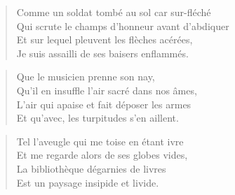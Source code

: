 \begin{verse}%
  \quatrain%
  Comme un soldat tombé au sol car sur-fléché\\  %
  Qui scrute le champs d’honneur avant d’abdiquer\\  %
  Et sur lequel pleuvent les flèches acérées,\\  %
  Je suis assailli de ses  baisers enflammés.
\end{verse}

%
\renewcommand\currentpoemtitle{Le nay}%
\begin{verse}%
  \quatrain%
  Que le musicien prenne son nay,\\  %
  Qu’il en insuffle l’air sacré dans nos âmes,\\  %
  L’air qui apaise et fait déposer les armes\\  %
  Et qu’avec, les turpitudes s’en aillent.
\end{verse}

\begin{verse}%
  \quatrain%
  Tel l’aveugle qui me toise en étant ivre\\  %
  Et me regarde alors de ses globes vides,\\  %
  La bibliothèque dégarnies de livres\\  %
  Est un paysage insipide et livide.
\end{verse}

